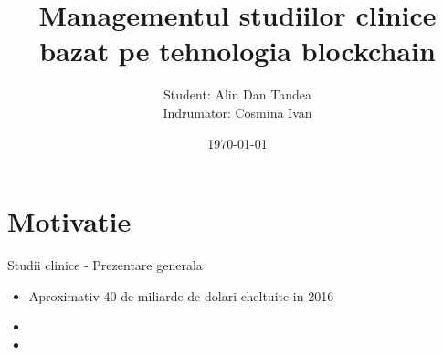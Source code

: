 \documentclass{beamer}
\title{Managementul studiilor clinice bazat pe tehnologia blockchain}
\date{\today}
\author{Student: Alin Dan Tandea \\
		Indrumator: Cosmina Ivan}
\institute{Universitatea Tehnica din Cluj Napoca}
\begin{document}
  \maketitle
  \section{Motivatie}
  \begin{frame}{Studii clinice - Prezentare generala}
  	\begin{itemize}[<+- | alert@+>]
    	\item Aproximativ 40 de miliarde de dolari cheltuite in 2016
    	\item 
    	\item 
  	\end{itemize}
  \end{frame}
\end{document}
